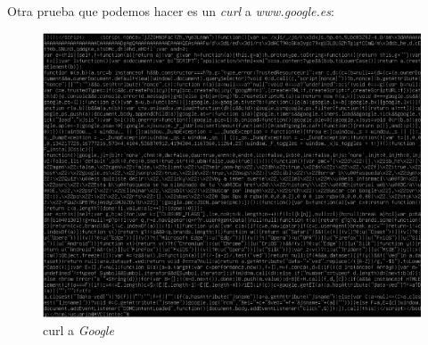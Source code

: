 \documentclass{report}
\begin{document}
  Otra prueba que podemos hacer es un \emph{curl} a \emph{www.google.es}:

  \begin{figure}[H]
    \centering
    \includegraphics[scale=0.65]{img/curl_google.png}
    \caption{curl a \emph{Google}}
    \label{fig:curl google}
  \end{figure}
\end{document}
